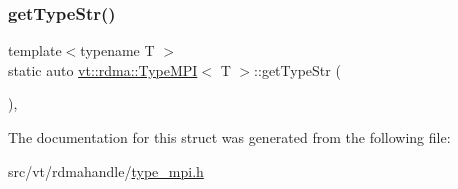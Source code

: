 \subsubsection{\texorpdfstring{get\+Type\+Str()}{getTypeStr()}}
{\footnotesize\ttfamily template$<$typename T $>$ \\
static auto \hyperlink{structvt_1_1rdma_1_1_type_m_p_i}{vt\+::rdma\+::\+Type\+M\+PI}$<$ T $>$\+::get\+Type\+Str (\begin{DoxyParamCaption}{ }\end{DoxyParamCaption})\hspace{0.3cm}{\ttfamily [inline]}, {\ttfamily [static]}}



The documentation for this struct was generated from the following file\+:\begin{DoxyCompactItemize}
\item 
src/vt/rdmahandle/\hyperlink{type__mpi_8h}{type\+\_\+mpi.\+h}\end{DoxyCompactItemize}
